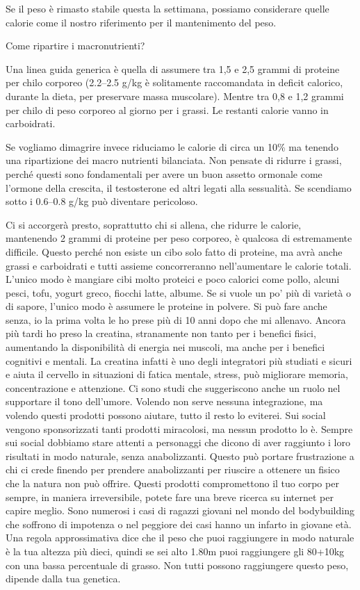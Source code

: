 \documentclass[12pt]{book} %
\begin{document}
Se il peso è rimasto stabile questa la settimana, possiamo considerare quelle calorie come il nostro riferimento per il mantenimento del peso.

Come ripartire i macronutrienti?

Una linea guida generica è quella di assumere tra 1,5 e 2,5 grammi di proteine per chilo corporeo (2.2–2.5 g/kg è solitamente raccomandata in deficit calorico, durante la dieta, per preservare massa muscolare). Mentre tra 0,8 e 1,2 grammi per chilo di peso corporeo al giorno per i grassi. Le restanti calorie vanno in carboidrati.

Se vogliamo dimagrire invece riduciamo le calorie di circa un 10\% ma tenendo una ripartizione dei macro nutrienti bilanciata. Non pensate di ridurre i grassi, perché questi sono fondamentali per avere un buon assetto ormonale come l'ormone della crescita, il testosterone ed altri legati alla sessualità. Se scendiamo sotto i 0.6–0.8 g/kg può diventare pericoloso.

Ci si accorgerà presto, soprattutto chi si allena, che ridurre le calorie, mantenendo 2 grammi di proteine per peso corporeo, è qualcosa di estremamente difficile. Questo perché non esiste un cibo solo fatto di proteine, ma avrà anche grassi e carboidrati e tutti assieme concorreranno nell'aumentare le calorie totali. L'unico modo è mangiare cibi molto proteici e poco calorici come pollo, alcuni pesci, tofu, yogurt greco, fiocchi latte, albume. Se si vuole un po' più di varietà o di sapore, l'unico modo è assumere le proteine in polvere. Si può fare anche senza, io la prima volta le ho prese più di 10 anni dopo che mi allenavo. Ancora più tardi ho preso la creatina, stranamente non tanto per i benefici fisici, aumentando la disponibilità di energia nei muscoli, ma anche per i benefici cognitivi e mentali. La creatina infatti è uno degli integratori più studiati e sicuri e aiuta il cervello in situazioni di fatica mentale, stress, può migliorare memoria, concentrazione e attenzione. Ci sono studi che suggeriscono anche un ruolo nel supportare il tono dell’umore.
Volendo non serve nessuna integrazione, ma volendo questi prodotti possono aiutare, tutto il resto lo eviterei. Sui social vengono sponsorizzati tanti prodotti miracolosi, ma nessun prodotto lo è. Sempre sui social dobbiamo stare attenti a personaggi che dicono di aver raggiunto i loro risultati in modo naturale, senza anabolizzanti. Questo può portare frustrazione a chi ci crede finendo per prendere anabolizzanti per riuscire a ottenere un fisico che la natura non può offrire. Questi prodotti compromettono il tuo corpo per sempre, in maniera irreversibile, potete fare una breve ricerca su internet per capire meglio. Sono numerosi i casi di ragazzi giovani nel mondo del bodybuilding che soffrono di impotenza o nel peggiore dei casi hanno un infarto in giovane età. Una regola approssimativa dice che il peso che puoi raggiungere in modo naturale è la tua altezza più dieci, quindi se sei alto 1.80m puoi raggiungere gli 80+10kg con una bassa percentuale di grasso. Non tutti possono raggiungere questo peso, dipende dalla tua genetica.
\end{document}
